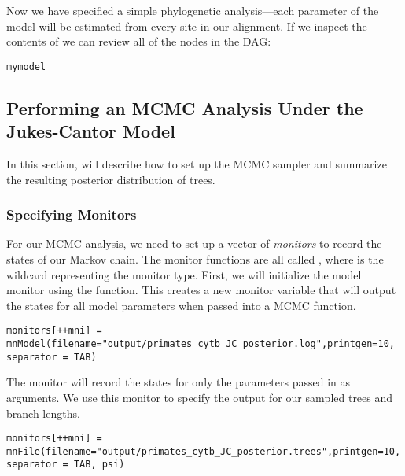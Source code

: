Now we have specified a simple phylogenetic analysis---each parameter of the model will be estimated from every site in our alignment.
If we inspect the contents of  we can review all of the nodes in the DAG:
{\tt \begin{snugshade*}
\begin{lstlisting}
mymodel
\end{lstlisting}
\end{snugshade*}}

\bigskip
\subsection{Performing an MCMC Analysis Under the Jukes-Cantor Model}

In this section, will describe how to set up the MCMC sampler and summarize the resulting posterior distribution of trees. 

\subsubsection{Specifying Monitors}

For our MCMC analysis, we need to set up a vector of \textit{monitors} to record the states of our Markov chain. 
The monitor functions are all called , where \cl{*} is the wildcard representing the monitor type.
First, we will initialize the model monitor using the  function. This creates a new monitor variable that will output the states for all model parameters when passed into a MCMC function. 
{\tt \begin{snugshade*}
\begin{lstlisting}
monitors[++mni] = mnModel(filename="output/primates_cytb_JC_posterior.log",printgen=10, separator = TAB)
\end{lstlisting}
\end{snugshade*}}

The  monitor will record the states for only the parameters passed in as arguments. We use this monitor to specify the output for our sampled trees and branch lengths.

{\tt \begin{snugshade*}
\begin{lstlisting}
monitors[++mni] = mnFile(filename="output/primates_cytb_JC_posterior.trees",printgen=10, separator = TAB, psi)
\end{lstlisting}
\end{snugshade*}}


